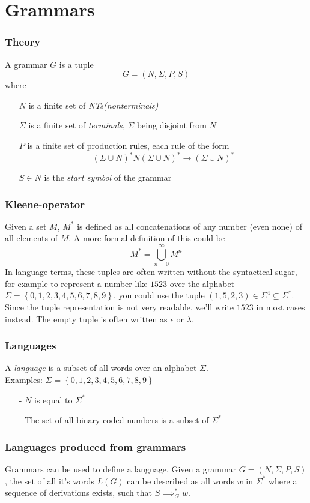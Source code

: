 \documentclass[a4paper]{article}
\newcommand{\tuple}[1]{\left( #1 \right)}
\newcommand{\set}[1]{\left\lbrace #1 \right\rbrace}
\begin{document}
\section*{Grammars}
\subsubsection*{Theory}
A grammar $G$ is a tuple 
$$ G = \tuple{N, \Sigma, P, S} $$
where \begin{itemize}
\item[$N$] is a finite set of \textit{NTs(nonterminals)}
\item[$\Sigma$] is a finite set of \textit{terminals}, $\Sigma$ being disjoint from $N$
\item[$P$] is a finite set of production rules, each rule of the form 
$$ (\Sigma\cup N)^*N(\Sigma\cup N)^*\to (\Sigma\cup N)^* $$
\item[$S\in N$] is the \textit{start symbol} of the grammar 
\end{itemize}

\subsubsection*{Kleene-operator}
Given a set $M$, $M^*$ is defined as all concatenations of any number (even none) of all elements of $M$. A more formal definition of this could be 
$$M^* = \bigcup_{n=0}^{\infty}M^n$$
In language terms, these tuples are often written without the syntactical sugar, for example to represent a number like $1523$ over the alphabet $\Sigma=\set{0,1,2,3,4,5,6,7,8,9}$, you could use the tuple $\tuple{1,5,2,3}\in\Sigma^4\subseteq\Sigma^*$. Since the tuple representation is not very readable, we'll write $1523$ in most cases instead. The empty tuple is often written as $\epsilon$ or $\lambda$.

\subsubsection*{Languages}
A \textit{language} is a subset of all words over an alphabet $\Sigma$. \\
Examples: $ \Sigma = \set{0,1,2,3,4,5,6,7,8,9} $
\begin{itemize}
\item[-] $N$ is equal to $\Sigma^*$
\item[-] The set of all binary coded numbers is a subset of $\Sigma^*$
\end{itemize}

\subsubsection*{Languages produced from grammars}
Grammars can be used to define a language. Given a grammar $G = \tuple{N, \Sigma, P, S}$, the set of all it's words $L(G)$ can be described as all words $w$ in $\Sigma^*$ where a sequence of derivations exists, such that $S\implies_G^* w$. 
\end{document}
